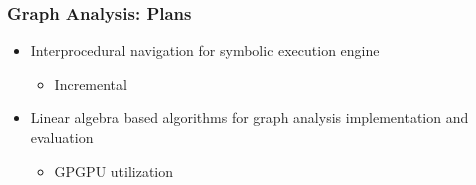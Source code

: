 \documentclass[xcolor=table,aspectratio=169]{beamer}
\begin{document}
\begin{frame}[fragile]
  \frametitle{Graph Analysis: Plans} 
  \begin{itemize}
    \item[\faHourglassHalf] Interprocedural navigation for symbolic execution engine
    \begin{itemize}
      \item Incremental
    \end{itemize}    
    \pause
    \item[\faHourglassHalf] Linear algebra based algorithms for graph analysis implementation and evaluation
    \begin{itemize}
      \item GPGPU utilization
    \end{itemize} 
    \end{itemize}
\end{frame}
\end{document}

